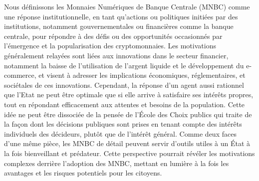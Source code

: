 \documentclass[12pt]{article}
\begin{document}
Nous définissons les Monnaies Numériques de Banque Centrale (MNBC) comme une réponse institutionnelle, en tant qu'actions ou politiques initiées par des institutions, notamment gouvernementales ou financières comme la banque centrale, pour répondre à des défis ou des opportunités occasionnés par l'émergence et la popularisation des cryptomonnaies. Les motivations généralement relayées sont liées aux innovations dans le secteur financier, notamment la baisse de l'utilisation de l'argent liquide et le développement du e-commerce, et visent à adresser les implications économiques, réglementaires, et sociétales de ces innovations. Cependant, la réponse d'un agent aussi rationnel que l'Etat ne peut être optimale que si elle arrive à satisfaire ses intérêts propres, tout en répondant efficacement aux attentes et besoins de la population. Cette idée ne peut être dissociée de la pensée de l'École des Choix publics qui traite de la façon dont les décisions publiques sont prises en tenant compte des intérêts individuels des décideurs, plutôt que de l'intérêt général. Comme deux faces d'une même pièce, les MNBC de détail peuvent servir d'outils utiles à un État à la fois bienveillant et prédateur. Cette perspective pourrait révéler les motivations complexes derrière l'adoption des MNBC, mettant en lumière à la fois les avantages et les risques potentiels pour les citoyens. \\
\end{document}
